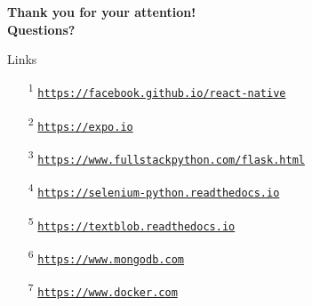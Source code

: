 \documentclass{beamer}
\begin{document}
  \begin{frame}[plain]{}
    \centering
    \Large \textbf{Thank you for your attention!}\\
    \vspace{2em}
    \Large \textbf{Questions?}
  \end{frame}


  \begin{frame}[plain]{Links}
    \begin{itemize}
      \item[\textsuperscript{1}] \label{link-react-native}\href{https://facebook.github.io/react-native}{\texttt{https://facebook.github.io/react-native}}
      \item[\textsuperscript{2}] \label{link-expo}\href{https://expo.io}{\texttt{https://expo.io}}
      \item[\textsuperscript{3}] \label{link-flask}\href{https://www.fullstackpython.com/flask.html}{\texttt{https://www.fullstackpython.com/flask.html}}
      \item[\textsuperscript{4}] \label{link-selenium}\href{https://selenium-python.readthedocs.io}{\texttt{https://selenium-python.readthedocs.io}}
      \item[\textsuperscript{5}] \label{link-textblob}\href{https://textblob.readthedocs.io}{\texttt{https://textblob.readthedocs.io}}
      \item[\textsuperscript{6}] \label{link-mongodb}\href{https://www.mongodb.com}{\texttt{https://www.mongodb.com}}
      \item[\textsuperscript{7}] \label{link-docker}\href{https://www.docker.com}{\texttt{https://www.docker.com}}
    \end{itemize}
  \end{frame}
\end{document}
